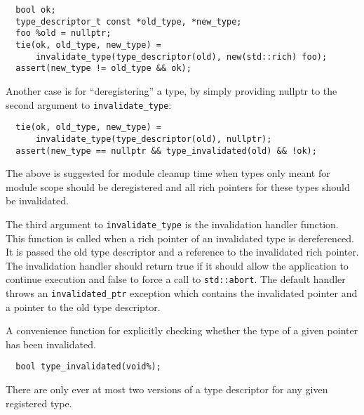 \begin{verbatim}
  bool ok;
  type_descriptor_t const *old_type, *new_type;
  foo %old = nullptr;
  tie(ok, old_type, new_type) =
      invalidate_type(type_descriptor(old), new(std::rich) foo);
  assert(new_type != old_type && ok);
\end{verbatim}

Another case is for ``deregistering'' a type, by simply providing nullptr to the
second argument to \verb+invalidate_type+:

\begin{verbatim}
  tie(ok, old_type, new_type) =
      invalidate_type(type_descriptor(old), nullptr);
  assert(new_type == nullptr && type_invalidated(old) && !ok);
\end{verbatim}

The above is suggested for module cleanup time when types only meant for module
scope should be deregistered and all rich pointers for these types should be
invalidated.

The third argument to \verb+invalidate_type+ is the invalidation handler
function. This function is called when a rich pointer of an invalidated type is
dereferenced. It is passed the old type descriptor and a reference to the
invalidated rich pointer.  The invalidation handler should return true if it
should allow the application to continue execution and false to force a call to
\verb+std::abort+. The default handler throws an \verb+invalidated_ptr+
exception which contains the invalidated pointer and a pointer to the old type
descriptor.

A convenience function for explicitly checking whether the type of a given
pointer has been invalidated.

\begin{verbatim}
  bool type_invalidated(void%);
\end{verbatim}

There are only ever at most two versions of a type descriptor for any given
registered type.


